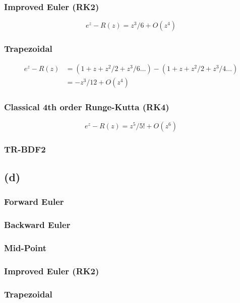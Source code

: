\documentclass{article}
\begin{document}
\subsubsection*{Improved Euler (RK2)}
\begin{equation}
e^z-R(z)=z^3/6+O(z^4)
\end{equation}

\subsubsection*{Trapezoidal}
\begin{align}
e^z-R(z)&=(1+z+z^2/2+z^3/6\dots)-(1+z+z^2/2+z^3/4\dots) \nonumber\\
&=-z^3/12+O(z^4)
\end{align}

\subsubsection*{Classical 4th order Runge-Kutta (RK4)}
\begin{equation}
e^z-R(z)=z^5/5!+O(z^6)
\end{equation}

\subsubsection*{TR-BDF2}

\subsection*{(d)}
\subsubsection*{Forward Euler}

\subsubsection*{Backward Euler}

\subsubsection*{Mid-Point}

\subsubsection*{Improved Euler (RK2)}

\subsubsection*{Trapezoidal}
\end{document}
